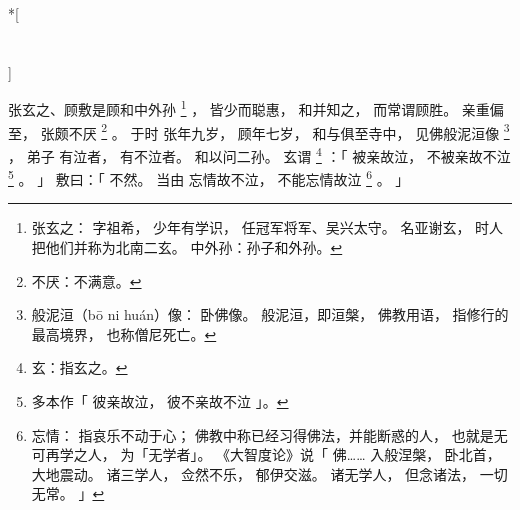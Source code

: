 
\switchcolumn[0]*[\section{}]

张玄之、顾敷是顾和中外孙%
\footnote{%
    张玄之：
        字祖希，
        少年有学识，
        任冠军将军、吴兴太守。
        名亚谢玄，
        时人把他们并称为北南二玄。
    中外孙：孙子和外孙。
}%
，
皆少而聪惠，
和并知之，
而常谓顾胜。
亲重偏至，
张颇不厌%
\footnote{%
    不厌：不满意。
}%
。
于时
张年九岁，
顾年七岁，
和与俱至寺中，
见佛般泥洹像%
\footnote{%
    般泥洹（bō ni huán）像：
        卧佛像。
        般泥洹，即洹槃，
        佛教用语，
        指修行的最高境界，
        也称僧尼死亡。
}%
，
弟子
  有泣者，
有不泣者。
和以问二孙。
玄谓%
\footnote{%
    玄：指玄之。
}%
：「
      被亲故泣，
    不被亲故不泣%
    \footnote{%
        多本作「
            彼亲故泣，
            彼不亲故不泣%
        」。
    }%
    。
」
敷曰：「
    不然。
    当由
        忘情故不泣，
    不能忘情故泣%
    \footnote{%
        忘情：
            指哀乐不动于心；
            佛教中称已经习得佛法，并能断惑的人，
            也就是无可再学之人，
            为「无学者」。
            《大智度论》说「
                  佛……
                  入般涅槃，
                  卧北首，
                  大地震动。
                  诸三学人，
                  佥然不乐，
                  郁伊交滋。
                  诸无学人，
                  但念诸法，
                  一切无常。
            」
    }%
    。
」

\switchcolumn


